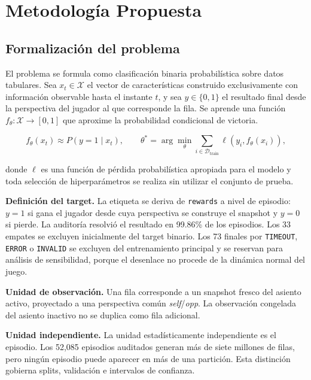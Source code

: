 \section{Metodología Propuesta}
\label{sec:metodologia}

\subsection{Formalización del problema}
\label{subsec:formalizacion}
El problema se formula como clasificación binaria probabilística sobre
datos tabulares. Sea $x_t\in\mathcal{X}$ el vector de características
construido exclusivamente con información observable hasta el instante
$t$, y sea $y\in\{0,1\}$ el resultado final desde la perspectiva del
jugador al que corresponde la fila. Se aprende una función
$f_\theta:\mathcal{X}\rightarrow[0,1]$ que aproxime la probabilidad
condicional de victoria.

\begin{equation}
\label{eq:objetivo}
  f_\theta(x_t) \approx P(y=1\mid x_t),
  \qquad
  \theta^{*}=\arg\min_{\theta}\sum_{i\in\mathcal{D}_{\mathrm{train}}}
  \ell\!\left(y_i,f_\theta(x_i)\right),
\end{equation}

donde $\ell$ es una función de pérdida probabilística apropiada para el
modelo y toda selección de hiperparámetros se realiza sin utilizar el
conjunto de prueba.

\noindent\textbf{Definición del target.} La etiqueta se deriva de
\texttt{rewards} a nivel de episodio: $y=1$ si gana el jugador desde
cuya perspectiva se construye el snapshot y $y=0$ si pierde. La
auditoría resolvió el resultado en 99.86\% de los episodios. Los 33
empates se excluyen inicialmente del target binario. Los 73 finales por
\texttt{TIMEOUT}, \texttt{ERROR} o \texttt{INVALID} se excluyen del
entrenamiento principal y se reservan para análisis de sensibilidad,
porque el desenlace no procede de la dinámica normal del juego.

\noindent\textbf{Unidad de observación.} Una fila corresponde a un
snapshot fresco del asiento activo, proyectado a una perspectiva común
\emph{self}/\emph{opp}. La observación congelada del asiento inactivo no
se duplica como fila adicional.

\noindent\textbf{Unidad independiente.} La unidad estadísticamente
independiente es el episodio. Los 52,085 episodios auditados generan
más de siete millones de filas, pero ningún episodio puede aparecer en
más de una partición. Esta distinción gobierna splits, validación e
intervalos de confianza.

